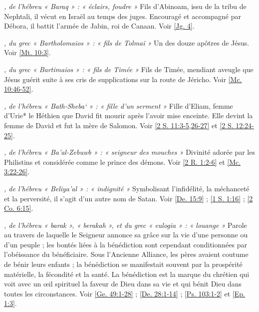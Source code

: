\begin{multicols}{2}
\textit{, de l'hébreu « Baraq » : « éclairs, foudre »}\newline
Fils d'Abinoam, issu de la tribu de Nephtali, il vécut en Israël au temps des juges. Encouragé et accompagné par Débora, il battit l'armée de Jabin, roi de Canaan. Voir \vref{Jg. 4}.

\textit{, du grec « Bartholomaios » : « fils de Tolmaï »}\newline
Un des douze apôtres de Jésus. Voir \vref{Mt. 10:3}.

\textit{, du grec « Bartimaios » : « fils de Timée »}\newline
Fils de Timée, mendiant aveugle que Jésus guérit suite à ses cris de supplications sur la route de Jéricho. Voir \vref{Mc. 10:46-52}.

\textit{, de l'hébreu « Bath-Sheba` » : « fille d'un serment »}\newline
Fille d'Eliam, femme d'Urie* le Héthien que David fit mourir après l'avoir mise enceinte. Elle devint la femme de David et fut la mère de Salomon. Voir \vref{2 S. 11:3-5,26-27} et \vref{2 S. 12:24-25}.

\textit{, de l'hébreu « Ba'al-Zebuwb » : « seigneur des mouches »}\newline
Divinité adorée par les Philistins et considérée comme le prince des démons. Voir \vref{2 R. 1:2-6} et \vref{Mc. 3:22-26}.

\textit{, de l'hébreu « Beliya'al » : « indignité »}\newline
Symbolisant l'infidélité, la méchanceté et la perversité, il s'agit d'un autre nom de Satan. Voir \vref{De. 15:9} ; \vref{1 S. 1:16} ; \vref{2 Co. 6:15}.

\textit{, de l'hébreu « barak », « berakah », et du grec « eulogia » : « louange »}\newline
Parole au travers de laquelle le Seigneur annonce sa grâce sur la vie d'une personne ou d'un peuple ; les bontés liées à la bénédiction sont cependant conditionnées par l'obéissance du bénéficiaire. Sous l'Ancienne Alliance, les pères avaient coutume de bénir leurs enfants ; la bénédiction se manifestait souvent par la prospérité matérielle, la fécondité et la santé. La bénédiction est la marque du chrétien qui voit avec un œil spirituel la faveur de Dieu dans sa vie et qui bénit Dieu dans toutes les circonstances. Voir \vref{Ge. 49:1-28} ; \vref{De. 28:1-14} ; \vref{Ps. 103:1-2} et \vref{Ep. 1:3}.


\end{multicols}
